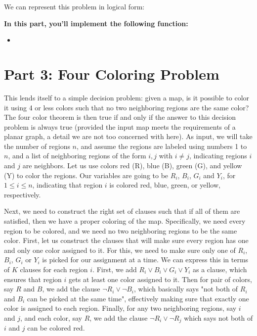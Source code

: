 \documentclass{article}
\begin{document}
We can represent this problem in logical form:


\textbf{In this part, you'll implement the following function:}
    
    \begin{itemize}
        \item 
    \end{itemize}

\section*{Part 3: Four Coloring Problem}


    This lends itself to a simple decision problem: given a map, is it possible to color it using 4 or less colors such that no two neighboring regions are the same color? The four color theorem is then true if and only if the answer to this decision problem is always true (provided the input map meets the requirements of a planar graph, a detail we are not too concerned with here). As input, we will take the number of regions $n$, and assume the regions are labeled using numbers 1 to $n$, and a list of neighboring regions of the form ${i,j}$ with $i\neq j$, indicating regions $i$ and $j$ are neighbors. Let us use colors red (R), blue (B), green (G), and yellow (Y) to color the regions. Our variables are going to be $R_i$, $B_i$, $G_i$ and $Y_i$, for $1 \leq i \leq n$, indicating that region $i$ is colored red, blue, green, or yellow, respectively.


    \vspace{1.5mm}
    Next, we need to construct the right set of clauses such that if all of them are satisfied, then we have a proper coloring of the map. Specifically, we need every region to be colored, and we need no two neighboring regions to be the same color. First, let us construct the clauses that will make sure every region has one and only one color assigned to it. For this, we need to make sure only one of $R_i$, $B_i$, $G_i$ or $Y_i$ is picked for our assignment at a time. We can express this in terms of $K$ clauses for each region $i$. First, we add $R_i \lor B_i \lor G_i \lor Y_i$ as a clause, which ensures that region $i$ gets at least one color assigned to it. Then for pair of colors, say $R$ and $B$, we add the clause $\neg R_i \lor \neg B_i$, which basically says "not both of $R_i$ and $B_i$ can be picked at the same time", effectively making sure that exactly one color is assigned to each region. Finally, for any two neighboring regions, say $i$ and $j$, and each color, say $R$, we add the clause $\neg R_i \lor \neg R_j$ which says not both of $i$ and $j$ can be colored red.
\end{document}
